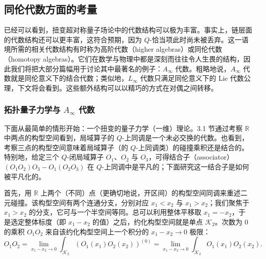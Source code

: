 
\subsection{同伦代数方面的考量}

已经可以看到，扭变超对称量子场论中的代数结构可以极为丰富。事实上，链层面的代数结构还可以更丰富，这符合预期，因为 $Q$-恰当项此时尚未被丢弃。这一语境所需的相关代数结构有时称为高阶代数（higher algebras）或同伦代数（homotopy algebras）。它们在数学与物理中都是深刻而往往令人生畏的结构，因此我们将把大部分篇幅用于讨论其中最著名的例子：$A_\infty$ 代数。粗略地说，$A_\infty$ 代数就是同伦意义下的结合代数；类似地，$L_\infty$ 代数只满足同伦意义下的 Lie 代数公理，下文将会看到。这些额外结构可以以精巧的方式在对偶之间转移。

\subsubsection{拓扑量子力学与 $A_\infty$ 代数}

下面从最简单的情形开始：一个扭变的量子力学（一维）理论。3.1 节通过考察 $\mathbb{R}$ 中两点的构型空间看到，局域算子的 $Q$-上同调是一个未必交换的代数。也看到，考察三点的构型空间意味着局域算子（的 $Q$-上同调类）的碰撞乘积还是结合的。特别地，给定三个 $Q$-闭局域算子 $O_1$、$O_2$ 与 $O_3$，可得结合子（associator）$(O_1O_2)O_3 - O_1(O_2O_3)$ 在 $Q$-上同调中是平凡的；下面研究这一结合子是如何被平凡化的。

首先，用 $\mathbb{R}$ 上两个（不同）点（更确切地说，开区间）的构型空间同调来重述二元碰撞。该构型空间有两个连通分支，分别对应 $x_1<x_2$ 与 $x_1>x_2$；我们聚焦于 $x_1>x_2$ 的分支，它可与一个半空间等同。总可以利用整体平移取 $x_1=-x_2$，于是选定整体标度（即 $x_1-x_2$ 的值）之后，约化构型空间就是单点 $\mathcal{K}_2$。次数为 0 的乘积 $O_1O_2$ 来自该约化构型空间上一个积分的 $x_1-x_2\to0$ 极限：
\begin{equation}\tag{3.17}
O_1O_2 = \lim_{x_1-x_2\to0}\int_{\mathcal{K}_2}(O_1(x_1)O_2(x_2))^{(0)} = \lim_{x_1-x_2\to0}\int_{\mathcal{K}_2}O_1(x_1)O_2(x_2).
\end{equation}

